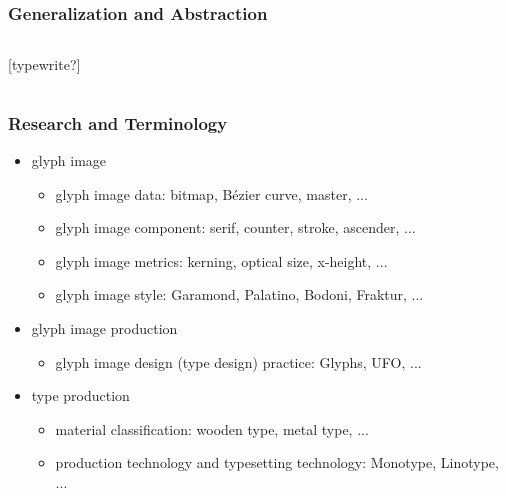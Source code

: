 \documentclass{beamer}
\begin{document}
	\begin{frame}
		\frametitle{Generalization and Abstraction}

		\begin{columns}[c]


			
			\begin{center}
				[typewrite?]
			\end{center}
		\end{columns}

	\end{frame}

	\begin{frame}
		\frametitle{Research and Terminology}

		\begin{itemize}
			\item glyph image
			\begin{itemize}
                \item glyph image data: bitmap, Bézier curve, master, ...
				\item glyph image component: serif, counter, stroke, ascender, ...
				\item glyph image metrics: kerning, optical size, x-height, ...
				\item glyph image style: Garamond, Palatino, Bodoni, Fraktur, ...
			\end{itemize}
			\item glyph image production
			\begin{itemize}
                \item glyph image design (type design) practice: Glyphs, UFO, ...
            \end{itemize}
            \item type production
			\begin{itemize}
                \item material classification: wooden type, metal type, ...
                \item production technology and typesetting technology: Monotype, Linotype, ...
            \end{itemize}
		\end{itemize}
	\end{frame}
\end{document}
